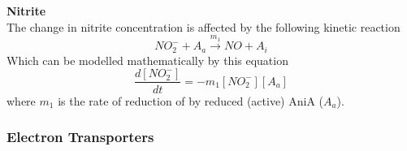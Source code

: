 {\bf Nitrite}\\
The change in nitrite concentration is affected by the following kinetic reaction
\begin{equation*}
NO_2^- + A_a \xrightarrow{m_1} NO + A_i
\end{equation*}
Which can be modelled mathematically by this equation
\begin{equation}
\frac{d[NO_2^-]}{dt} = - m_{1}[NO_2^-][A_a]
\label{eq:nitrite}
\end{equation}
where $m_{1}$ is the rate of reduction of \cNitrite{} by reduced (active) AniA ($A_a$).

\subsubsection{Electron Transporters}

